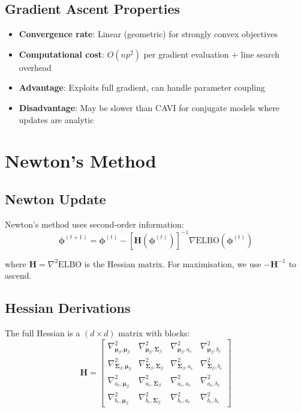\documentclass[11pt]{article}
\newcommand{\ELBO}{\text{ELBO}}
\begin{document}
\subsection{Gradient Ascent Properties}

\begin{itemize}
\item \textbf{Convergence rate}: Linear (geometric) for strongly convex objectives
\item \textbf{Computational cost}: $O(np^2)$ per gradient evaluation + line search overhead
\item \textbf{Advantage}: Exploits full gradient, can handle parameter coupling
\item \textbf{Disadvantage}: May be slower than CAVI for conjugate models where updates are analytic
\end{itemize}

\section{Newton's Method}

\subsection{Newton Update}

Newton's method uses second-order information:
\begin{equation}
\bm{\phi}^{(t+1)} = \bm{\phi}^{(t)} - [\bm{H}(\bm{\phi}^{(t)})]^{-1} \nabla \ELBO(\bm{\phi}^{(t)})
\end{equation}

where $\bm{H} = \nabla^2 \ELBO$ is the Hessian matrix. For maximisation, we use $-\bm{H}^{-1}$ to ascend.

\subsection{Hessian Derivations}

The full Hessian is a $(d \times d)$ matrix with blocks:
\begin{equation}
\bm{H} = \begin{bmatrix}
\nabla^2_{\bm{\mu}_\beta, \bm{\mu}_\beta} & \nabla^2_{\bm{\mu}_\beta, \bm{\Sigma}_\beta} & \nabla^2_{\bm{\mu}_\beta, a_e} & \nabla^2_{\bm{\mu}_\beta, b_e} \\
\nabla^2_{\bm{\Sigma}_\beta, \bm{\mu}_\beta} & \nabla^2_{\bm{\Sigma}_\beta, \bm{\Sigma}_\beta} & \nabla^2_{\bm{\Sigma}_\beta, a_e} & \nabla^2_{\bm{\Sigma}_\beta, b_e} \\
\nabla^2_{a_e, \bm{\mu}_\beta} & \nabla^2_{a_e, \bm{\Sigma}_\beta} & \nabla^2_{a_e, a_e} & \nabla^2_{a_e, b_e} \\
\nabla^2_{b_e, \bm{\mu}_\beta} & \nabla^2_{b_e, \bm{\Sigma}_\beta} & \nabla^2_{b_e, a_e} & \nabla^2_{b_e, b_e}
\end{bmatrix}
\end{equation}
\end{document}
